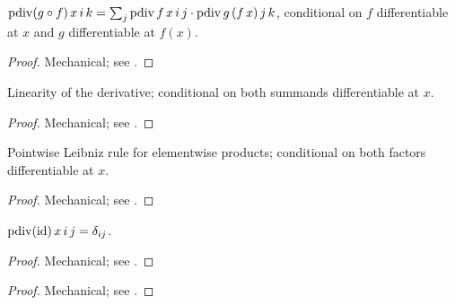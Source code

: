 \begin{theorem}
  \label{ax:pdiv_comp}
  \leanok
  \(\operatorname{pdiv}(g \circ f)\, x\, i\, k = \sum_j \operatorname{pdiv} f\, x\, i\, j \cdot \operatorname{pdiv} g\, (f\, x)\, j\, k\),
  conditional on \(f\) differentiable at \(x\) and \(g\) differentiable at \(f(x)\).
\end{theorem}

\begin{proof}
\leanok
Mechanical; see .
\end{proof}

\begin{theorem}
  \label{ax:pdiv_add}
  \leanok
  Linearity of the derivative; conditional on both summands differentiable at \(x\).
\end{theorem}

\begin{proof}
\leanok
Mechanical; see .
\end{proof}

\begin{theorem}
  \label{ax:pdiv_mul}
  \leanok
  Pointwise Leibniz rule for elementwise products; conditional on both factors
  differentiable at \(x\).
\end{theorem}

\begin{proof}
\leanok
Mechanical; see .
\end{proof}

\begin{theorem}
  \label{ax:pdiv_id}
  \leanok
  \(\operatorname{pdiv}(\mathrm{id})\, x\, i\, j = \delta_{ij}\).
\end{theorem}

\begin{proof}
\leanok
Mechanical; see .
\end{proof}

\begin{theorem}
  \label{ax:pdiv_const}
  \leanok
\end{theorem}

\begin{proof}
\leanok
Mechanical; see .
\end{proof}

